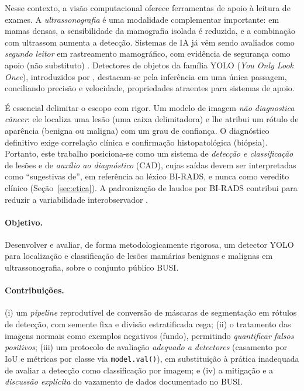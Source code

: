 \documentclass[11pt,a4paper]{article}
\begin{document}
Nesse contexto, a visão computacional oferece ferramentas de apoio à leitura de
exames. A \emph{ultrassonografia} é uma modalidade complementar importante: em
mamas densas, a sensibilidade da mamografia isolada é reduzida, e a combinação
com ultrassom aumenta a detecção. Sistemas de IA já vêm sendo avaliados como
\emph{segundo leitor} em rastreamento mamográfico, com evidência de segurança
como apoio (não substituto) \citep{lang2023}. Detectores de objetos da família
YOLO (\textit{You Only Look Once}), introduzidos por \citet{redmon2016},
destacam-se pela inferência em uma única passagem, conciliando precisão e
velocidade, propriedades atraentes para sistemas de apoio.

É essencial delimitar o escopo com rigor. Um modelo de imagem \emph{não
diagnostica câncer}: ele localiza uma lesão (uma caixa delimitadora) e lhe
atribui um rótulo de aparência (benigna ou maligna) com um grau de confiança. O
diagnóstico definitivo exige correlação clínica e confirmação histopatológica
(biópsia). Portanto, este trabalho posiciona-se como um sistema de
\emph{detecção e classificação} de lesões e de \emph{auxílio ao diagnóstico}
(CAD), cujas saídas devem ser interpretadas como ``sugestivas de'', em referência
ao léxico BI-RADS, e nunca como veredito clínico (Seção~\ref{sec:etica}). A
padronização de laudos por BI-RADS contribui para reduzir a variabilidade
interobservador \citep{pires2004}.

\paragraph{Objetivo.} Desenvolver e avaliar, de forma metodologicamente
rigorosa, um detector YOLO para localização e classificação de lesões mamárias
benignas e malignas em ultrassonografia, sobre o conjunto público BUSI.

\paragraph{Contribuições.} (i) um \emph{pipeline} reprodutível de conversão de
máscaras de segmentação em rótulos de detecção, com semente fixa e divisão
estratificada cega; (ii) o tratamento das imagens normais como exemplos
negativos (fundo), permitindo \emph{quantificar falsos positivos}; (iii) um
protocolo de avaliação \emph{adequado a detectores} (casamento por IoU e métricas
por classe via \texttt{model.val()}), em substituição à prática inadequada de
avaliar a detecção como classificação por imagem; e (iv) a mitigação e a
\emph{discussão explícita} do vazamento de dados documentado no BUSI.
\end{document}
